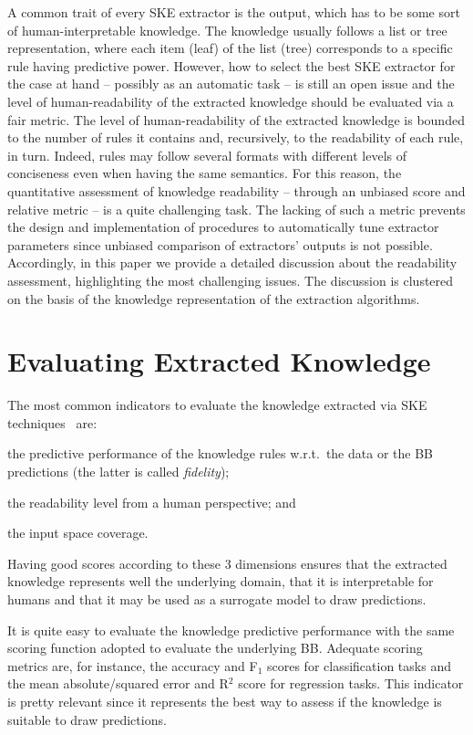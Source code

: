 \documentclass[sigconf]{acmart}
\begin{document}
A common trait of every SKE extractor is the output, which has to be some sort of human-interpretable knowledge.
%
The knowledge usually follows a list or tree representation, where each item (leaf) of the list (tree) corresponds to a specific rule having predictive power.
%
However, how to select the best SKE extractor for the case at hand -- possibly as an automatic task -- is still an open issue and the level of human-readability of the extracted knowledge should be evaluated via a fair metric.
%
The level of human-readability of the extracted knowledge is bounded to the number of rules it contains and, recursively, to the readability of each rule, in turn.
%
Indeed, rules may follow several formats with different levels of conciseness even when having the same semantics.
%
For this reason, the quantitative assessment of knowledge readability -- through an unbiased score and relative metric -- is a quite challenging task.
%
The lacking of such a metric prevents the design and implementation of procedures to automatically tune extractor parameters since unbiased comparison of extractors' outputs is not possible.
%
Accordingly, in this paper we provide a detailed discussion about the readability assessment, highlighting the most challenging issues. The discussion is clustered on the basis of the knowledge representation of the extraction algorithms.

\section{Evaluating Extracted Knowledge}

The most common indicators to evaluate the knowledge extracted via SKE techniques~\cite{garcez2001symbolic,tran2013knowledge} are:
%
\begin{inlinelist}
	\item the predictive performance of the knowledge rules w.r.t.\ the data or the BB predictions (the latter is called \emph{fidelity});
	\item the readability level from a human perspective; and
	\item the input space coverage.
\end{inlinelist}
%
Having good scores according to these 3 dimensions ensures that the extracted knowledge represents well the underlying domain, that it is interpretable for humans and that it may be used as a surrogate model to draw predictions. 

It is quite easy to evaluate the knowledge predictive performance with the same scoring function adopted to evaluate the underlying BB.
%
Adequate scoring metrics are, for instance, the accuracy and F$_1$ scores for classification tasks and the mean absolute/squared error and R$^2$ score for regression tasks.
%
This indicator is pretty relevant since it represents the best way to assess if the knowledge is suitable to draw predictions.
\end{document}
